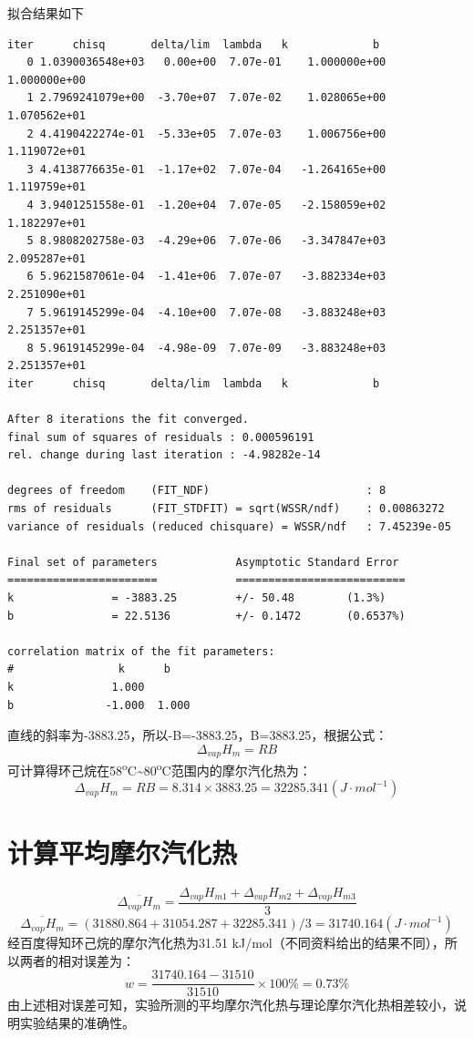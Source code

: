 \documentclass[11pt]{report}
\begin{document}
\begin{enumerate}
拟合结果如下
\begin{verbatim}
iter      chisq       delta/lim  lambda   k             b            
   0 1.0390036548e+03   0.00e+00  7.07e-01    1.000000e+00   1.000000e+00
   1 2.7969241079e+00  -3.70e+07  7.07e-02    1.028065e+00   1.070562e+01
   2 4.4190422274e-01  -5.33e+05  7.07e-03    1.006756e+00   1.119072e+01
   3 4.4138776635e-01  -1.17e+02  7.07e-04   -1.264165e+00   1.119759e+01
   4 3.9401251558e-01  -1.20e+04  7.07e-05   -2.158059e+02   1.182297e+01
   5 8.9808202758e-03  -4.29e+06  7.07e-06   -3.347847e+03   2.095287e+01
   6 5.9621587061e-04  -1.41e+06  7.07e-07   -3.882334e+03   2.251090e+01
   7 5.9619145299e-04  -4.10e+00  7.07e-08   -3.883248e+03   2.251357e+01
   8 5.9619145299e-04  -4.98e-09  7.07e-09   -3.883248e+03   2.251357e+01
iter      chisq       delta/lim  lambda   k             b            

After 8 iterations the fit converged.
final sum of squares of residuals : 0.000596191
rel. change during last iteration : -4.98282e-14

degrees of freedom    (FIT_NDF)                        : 8
rms of residuals      (FIT_STDFIT) = sqrt(WSSR/ndf)    : 0.00863272
variance of residuals (reduced chisquare) = WSSR/ndf   : 7.45239e-05

Final set of parameters            Asymptotic Standard Error
=======================            ==========================
k               = -3883.25         +/- 50.48        (1.3%)
b               = 22.5136          +/- 0.1472       (0.6537%)

correlation matrix of the fit parameters:
#                k      b      
k               1.000 
b              -1.000  1.000 

\end{verbatim}
直线的斜率为-3883.25，所以-B=-3883.25，B=3883.25，根据公式：
\[
     \Delta_{vap}H_{m}=RB
     \]
可计算得环己烷在58\textsuperscript{o}C\textasciitilde{}80\textsuperscript{o}C范围内的摩尔汽化热为：
\[
     \Delta_{vap}H_{m}=RB=8.314\times 3883.25=32285.341(J\cdot mol^{-1})
     \]
\end{enumerate}

\section{计算平均摩尔汽化热}
\label{sec:orgf75faeb}
\[
    \overline{\Delta_{vap}H_{m}}=\frac{\Delta_{vap}H_{m1}+\Delta_{vap}H_{m2}+\Delta_{vap}H_{m3}}{3}
    \]
\[
    \overline{\Delta_{vap}H_{m}}=(31880.864+31054.287+32285.341)/3=31740.164(J\cdot mol^{-1})
    \]
经百度得知环己烷的摩尔汽化热为31.51 kJ/mol（不同资料给出的结果不同），所以两者的相对误差为：
\[
    w=\frac{31740.164-31510}{31510}\times 100\% =0.73\%
    \]
由上述相对误差可知，实验所测的平均摩尔汽化热与理论摩尔汽化热相差较小，说明实验结果的准确性。
\end{document}
